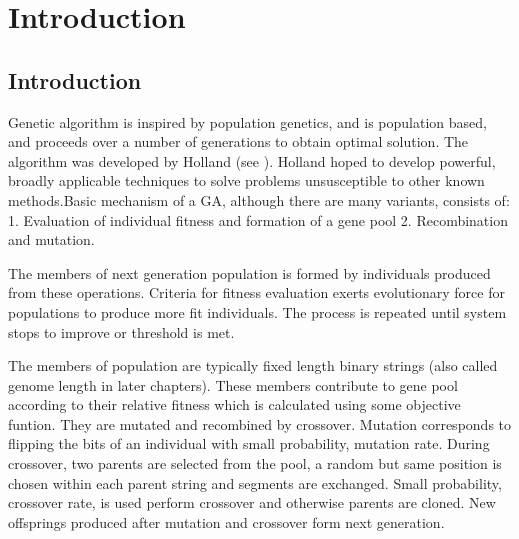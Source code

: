 \chapter{Introduction} \label{ch:introduction}

\section{Introduction}
Genetic algorithm is inspired by population genetics, and is population based, and proceeds over a number of generations to obtain optimal solution. The algorithm was developed by Holland (see \cite{Holland1975}). Holland hoped to develop powerful, broadly applicable techniques to solve problems unsusceptible to other known methods.Basic mechanism of a GA, although there are many variants, consists of:
1. Evaluation of individual fitness and formation of a gene pool
2. Recombination and mutation.

The members of next generation population is formed by individuals produced from these operations. Criteria for fitness evaluation exerts evolutionary force for populations to produce more fit individuals. The process is repeated until system stops to improve or threshold is met.

The members of population are typically fixed length binary strings (also called genome length in later chapters). These members contribute to gene pool according to their relative fitness which is calculated using some objective funtion. They are mutated and recombined by crossover. Mutation corresponds to flipping the bits of an individual with small probability, mutation rate. During crossover, two parents are selected from the pool, a random but same position is chosen within each parent string and segments are exchanged. Small probability, crossover rate, is used perform crossover and otherwise parents are cloned. New offsprings produced after mutation and crossover form next generation.

